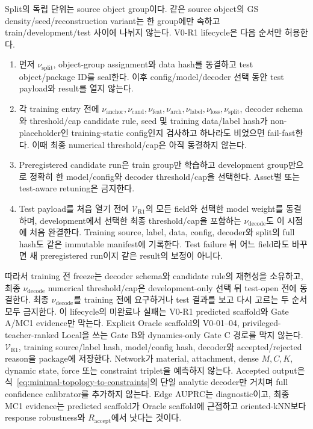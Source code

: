 \documentclass[11pt]{article}
\begin{document}
Split의 독립 단위는 source object group이다. 같은 source object의 GS density/seed/reconstruction variant는
한 group에만 속하고 train/development/test 사이에 나뉘지 않는다. V0-R1 lifecycle은 다음 순서만 허용한다.
\begin{enumerate}
  \item 먼저 \(\nu_{\mathrm{split}}\), object-group assignment와 data hash를 동결하고 test object/package ID를
  seal한다. 이후 config/model/decoder 선택 동안 test payload와 result를 열지 않는다.
  \item 각 training entry 전에
  \(\nu_{\mathrm{anchor}},\nu_{\mathrm{cand}},\nu_{\mathrm{feat}},\nu_{\mathrm{arch}},
  \nu_{\mathrm{label}},\nu_{\mathrm{loss}},\nu_{\mathrm{split}}\), decoder schema와 threshold/cap
  candidate rule, seed 및 training data/label hash가 non-placeholder인 training-static config인지 검사하고
  하나라도 비었으면 fail-fast한다. 이때 최종 numerical threshold/cap은 아직 동결하지 않는다.
  \item Preregistered candidate run은 train group만 학습하고 development group만으로 정확히 한
  model/config와 decoder threshold/cap을 선택한다. Asset별 또는 test-aware retuning은 금지한다.
  \item Test payload를 처음 열기 전에 \(\mathcal V_{\mathrm{R1}}\)의 모든 field와 선택한 model weight를
  동결하며, development에서 선택한 최종 threshold/cap을 포함하는 \(\nu_{\mathrm{decode}}\)도 이 시점에
  처음 완결한다. Training source, label, data, config, decoder와 split의 full hash도 같은 immutable
  manifest에 기록한다.
  Test failure 뒤 어느 field라도 바꾸면 새 preregistered run이지 같은 result의 보정이 아니다.
\end{enumerate}
따라서 training 전 freeze는 decoder schema와 candidate rule의 재현성을 소유하고,
최종 \(\nu_{\mathrm{decode}}\) numerical threshold/cap은 development-only 선택 뒤 test-open 전에 동결한다.
최종 \(\nu_{\mathrm{decode}}\)를 training 전에 요구하거나 test 결과를 보고 다시 고르는 두 순서 모두 금지한다.
이 lifecycle의 미완료나 실패는 V0-R1 predicted scaffold와 Gate A/MC1 evidence만 막는다.
Explicit Oracle scaffold의 V0-01--04, privileged-teacher-ranked Local을 쓰는 Gate B와
dynamics-only Gate C 경로를 막지 않는다.
\(\mathcal V_{\mathrm{R1}}\), training source/label hash, model/config hash, decoder와 accepted/rejected reason을
package에 저장한다. Network가 material, attachment,
dense \(M,C,K\), dynamic state, force 또는 constraint triplet을 예측하지 않는다. Accepted output은
식~\eqref{eq:minimal-topology-to-constraints}의 단일 analytic decoder만 거치며 full confidence calibrator를
추가하지 않는다. Edge AUPRC는 diagnostic이고, 최종 MC1 evidence는 predicted scaffold가 Oracle scaffold에 근접하고
oriented-kNN보다 response robustness와 \(R_{\mathrm{accept}}\)에서 낫다는 것이다.
\end{document}
